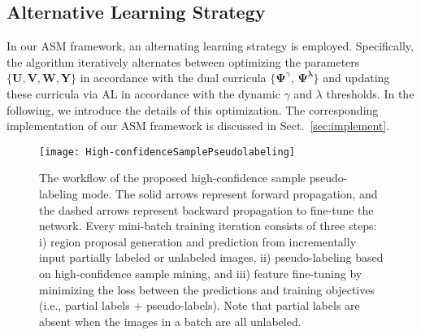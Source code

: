 \documentclass[journal]{IEEEtran}
\begin{document}
\subsection{Alternative Learning Strategy}
In our {ASM} framework, an alternating learning strategy is employed. {Specifically, the algorithm iteratively alternates between optimizing the parameters $\{ \mathbf{U}, \mathbf{V}, \mathbf{W}, \mathbf{Y}\}$ in accordance with the dual curricula $\{ \mathbf{\Psi}^{\gamma}$, $\mathbf{\Psi}^{\bm \lambda}\}$ and updating these curricula via AL in accordance with the dynamic $\gamma$ and $\lambda$ thresholds.}
In the following, we introduce the details of this optimization. The corresponding implementation of our {ASM} framework is discussed in Sect.~\ref{sec:implement}. 

\begin{figure*}[t]
\center
\texttt{[image: High-confidenceSamplePseudolabeling]}
\vspace{-10pt}
\caption{The workflow of the proposed high-confidence sample pseudo-labeling mode. The solid arrows represent forward propagation, and the dashed arrows represent backward propagation to fine-tune the network. Every mini-batch training iteration consists of three steps: i) region proposal generation and prediction from incrementally input partially labeled or unlabeled images, ii) pseudo-labeling based on high-confidence sample mining, and iii) feature fine-tuning by minimizing the loss between the predictions and training objectives (i.e., partial labels + pseudo-labels). Note that partial labels are absent when the images in a batch are all unlabeled.}
\vspace{-10pt}
\label{fig:highconfidence}
\end{figure*}
\end{document}
